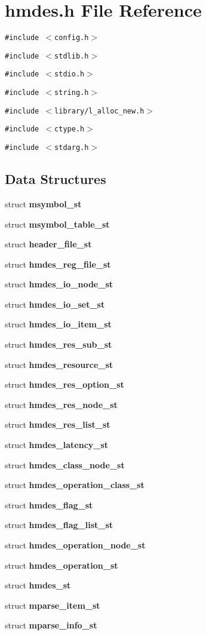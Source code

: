 \section{hmdes.h File Reference}
\label{hmdes_8h}
{\tt \#include $<$config.h$>$}\par
{\tt \#include $<$stdlib.h$>$}\par
{\tt \#include $<$stdio.h$>$}\par
{\tt \#include $<$string.h$>$}\par
{\tt \#include $<$library/l\_\-alloc\_\-new.h$>$}\par
{\tt \#include $<$ctype.h$>$}\par
{\tt \#include $<$stdarg.h$>$}\par
\subsection*{Data Structures}
\begin{CompactItemize}
\item 
struct \bf{msymbol\_\-st}
\item 
struct \bf{msymbol\_\-table\_\-st}
\item 
struct \bf{header\_\-file\_\-st}
\item 
struct \bf{hmdes\_\-reg\_\-file\_\-st}
\item 
struct \bf{hmdes\_\-io\_\-node\_\-st}
\item 
struct \bf{hmdes\_\-io\_\-set\_\-st}
\item 
struct \bf{hmdes\_\-io\_\-item\_\-st}
\item 
struct \bf{hmdes\_\-res\_\-sub\_\-st}
\item 
struct \bf{hmdes\_\-resource\_\-st}
\item 
struct \bf{hmdes\_\-res\_\-option\_\-st}
\item 
struct \bf{hmdes\_\-res\_\-node\_\-st}
\item 
struct \bf{hmdes\_\-res\_\-list\_\-st}
\item 
struct \bf{hmdes\_\-latency\_\-st}
\item 
struct \bf{hmdes\_\-class\_\-node\_\-st}
\item 
struct \bf{hmdes\_\-operation\_\-class\_\-st}
\item 
struct \bf{hmdes\_\-flag\_\-st}
\item 
struct \bf{hmdes\_\-flag\_\-list\_\-st}
\item 
struct \bf{hmdes\_\-operation\_\-node\_\-st}
\item 
struct \bf{hmdes\_\-operation\_\-st}
\item 
struct \bf{hmdes\_\-st}
\item 
struct \bf{mparse\_\-item\_\-st}
\item 
struct \bf{mparse\_\-info\_\-st}
\end{CompactItemize}
